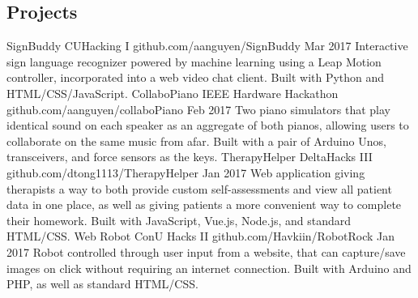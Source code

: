 \documentclass[]{aanguyen_cv}
\begin{document}
\begin{main}
		\section{Projects}
			\mainentry%
				{SignBuddy{\faGithub}}%
				{CUHacking I}%
				{github.com/aanguyen/SignBuddy}%
				{Mar 2017}%
				{Interactive sign language recognizer powered by machine learning using a Leap Motion controller, incorporated into a web video chat client. Built with Python and HTML/CSS/JavaScript.}
			\mainentry%
				{CollaboPiano {\faGithub}}%
				{IEEE Hardware Hackathon}%
				{github.com/aanguyen/collaboPiano}%
				{Feb 2017}%
				{Two piano simulators that play identical sound on each speaker as an aggregate of both pianos, allowing users to collaborate on the same music from afar. Built with a pair of Arduino Unos, transceivers, and force sensors as the keys.}
			\mainentry%
				{TherapyHelper {\faGithub}}%
				{DeltaHacks III}%
				{github.com/dtong1113/TherapyHelper}%
				{Jan 2017}%
				{Web application giving therapists a way to both provide custom self-assessments and view all patient data in one place, as well as giving patients a more convenient way to complete their homework. Built with JavaScript, Vue.js, Node.js, and standard HTML/CSS.}
			\mainentry%
				{Web Robot {\faGithub}}%
				{ConU Hacks II}%
				{github.com/Havkiin/RobotRock}%
				{Jan 2017}%
				{Robot controlled through user input from a website, that can capture/save images on click without requiring an internet connection. Built with Arduino and PHP, as well as standard HTML/CSS.}
			\vspace{0.65cm}%
	\end{main}%
\end{document}
